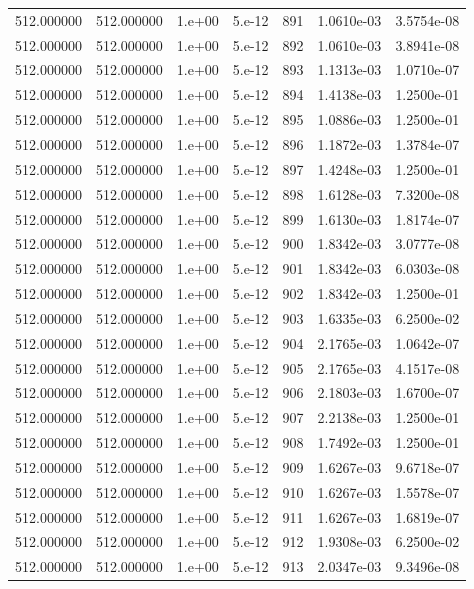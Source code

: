 \begin{table}[htbp]
\begin{tabular}{rrrrrrr}
512.000000 & 512.000000 & 1.e+00 & 5.e-12 & 891 & 1.0610e-03 & 3.5754e-08 \\
512.000000 & 512.000000 & 1.e+00 & 5.e-12 & 892 & 1.0610e-03 & 3.8941e-08 \\
512.000000 & 512.000000 & 1.e+00 & 5.e-12 & 893 & 1.1313e-03 & 1.0710e-07 \\
512.000000 & 512.000000 & 1.e+00 & 5.e-12 & 894 & 1.4138e-03 & 1.2500e-01 \\
512.000000 & 512.000000 & 1.e+00 & 5.e-12 & 895 & 1.0886e-03 & 1.2500e-01 \\
512.000000 & 512.000000 & 1.e+00 & 5.e-12 & 896 & 1.1872e-03 & 1.3784e-07 \\
512.000000 & 512.000000 & 1.e+00 & 5.e-12 & 897 & 1.4248e-03 & 1.2500e-01 \\
512.000000 & 512.000000 & 1.e+00 & 5.e-12 & 898 & 1.6128e-03 & 7.3200e-08 \\
512.000000 & 512.000000 & 1.e+00 & 5.e-12 & 899 & 1.6130e-03 & 1.8174e-07 \\
512.000000 & 512.000000 & 1.e+00 & 5.e-12 & 900 & 1.8342e-03 & 3.0777e-08 \\
512.000000 & 512.000000 & 1.e+00 & 5.e-12 & 901 & 1.8342e-03 & 6.0303e-08 \\
512.000000 & 512.000000 & 1.e+00 & 5.e-12 & 902 & 1.8342e-03 & 1.2500e-01 \\
512.000000 & 512.000000 & 1.e+00 & 5.e-12 & 903 & 1.6335e-03 & 6.2500e-02 \\
512.000000 & 512.000000 & 1.e+00 & 5.e-12 & 904 & 2.1765e-03 & 1.0642e-07 \\
512.000000 & 512.000000 & 1.e+00 & 5.e-12 & 905 & 2.1765e-03 & 4.1517e-08 \\
512.000000 & 512.000000 & 1.e+00 & 5.e-12 & 906 & 2.1803e-03 & 1.6700e-07 \\
512.000000 & 512.000000 & 1.e+00 & 5.e-12 & 907 & 2.2138e-03 & 1.2500e-01 \\
512.000000 & 512.000000 & 1.e+00 & 5.e-12 & 908 & 1.7492e-03 & 1.2500e-01 \\
512.000000 & 512.000000 & 1.e+00 & 5.e-12 & 909 & 1.6267e-03 & 9.6718e-07 \\
512.000000 & 512.000000 & 1.e+00 & 5.e-12 & 910 & 1.6267e-03 & 1.5578e-07 \\
512.000000 & 512.000000 & 1.e+00 & 5.e-12 & 911 & 1.6267e-03 & 1.6819e-07 \\
512.000000 & 512.000000 & 1.e+00 & 5.e-12 & 912 & 1.9308e-03 & 6.2500e-02 \\
512.000000 & 512.000000 & 1.e+00 & 5.e-12 & 913 & 2.0347e-03 & 9.3496e-08 \\

\end{tabular}
\end{table}
